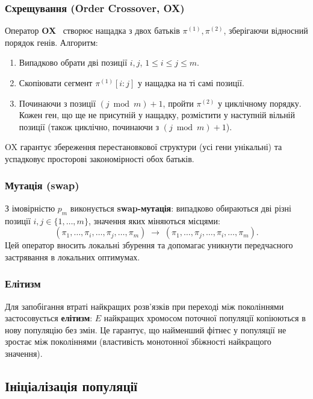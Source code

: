 \documentclass[14pt,a4paper]{extarticle}
\theoremstyle{definition}
\theoremstyle{plain}
\begin{document}
\subsubsection{Схрещування (Order Crossover, OX)}

Оператор \textbf{OX}~\cite{oliver1987} створює нащадка з двох батьків $\pi^{(1)}, \pi^{(2)}$, зберігаючи відносний порядок генів. Алгоритм:

\begin{enumerate}[leftmargin=2em]
    \item Випадково обрати дві позиції $i, j$, $1 \leq i \leq j \leq m$.
    \item Скопіювати сегмент $\pi^{(1)}[i{:}j]$ у нащадка на ті самі позиції.
    \item Починаючи з позиції $(j \bmod m) + 1$, пройти $\pi^{(2)}$ у циклічному порядку. Кожен ген, що ще не присутній у нащадку, розмістити у наступній вільній позиції (також циклічно, починаючи з $(j \bmod m) + 1$).
\end{enumerate}

OX гарантує збереження перестановкової структури (усі гени унікальні) та успадковує просторові закономірності обох батьків.

\subsubsection{Мутація (swap)}

З імовірністю $p_m$ виконується \textbf{swap-мутація}: випадково обираються дві різні позиції $i, j \in \{1, \ldots, m\}$, значення яких міняються місцями:
\[
    (\pi_1, \ldots, \pi_i, \ldots, \pi_j, \ldots, \pi_m)
    \;\longrightarrow\;
    (\pi_1, \ldots, \pi_j, \ldots, \pi_i, \ldots, \pi_m).
\]
Цей оператор вносить локальні збурення та допомагає уникнути передчасного застрявання в локальних оптимумах.

\subsubsection{Елітизм}

Для запобігання втраті найкращих розв'язків при переході між поколіннями застосовується \textbf{елітизм}: $E$ найкращих хромосом поточної популяції копіюються в нову популяцію без змін. Це гарантує, що найменший фітнес у популяції не зростає між поколіннями (властивість монотонної збіжності найкращого значення).

\subsection{Ініціалізація популяції}\label{subsec:init}
\end{document}
